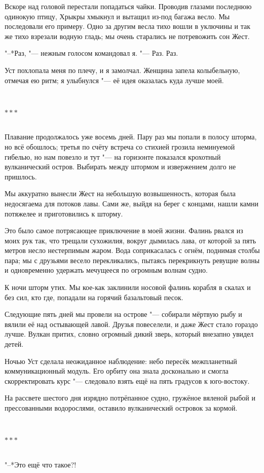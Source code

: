 \documentclass[a4paper,12pt,fleqn]{book}
\newcommand{\razd}{~\\{\centering\Large\bfseries$\ast \ast \ast$\par}~\\}
\begin{document}
Вскоре над головой перестали попадаться чайки.
Проводив глазами последнюю одинокую птицу, Хрыкры хмыкнул и вытащил из-под багажа весло.
Мы последовали его примеру.
Одно за другим весла тихо вошли в уключины и так же тихо взрезали водную гладь;
мы очень старались не потревожить сон Жест.

"--*Раз, "--- нежным голосом командовал я.
"--- Раз.
Раз.

Уст похлопала меня по плечу, и я замолчал.
Женщина запела колыбельную, отмечая ею ритм;
я улыбнулся "--- её идея оказалась куда лучше моей.

\razd

Плавание продолжалось уже восемь дней.
Пару раз мы попали в полосу шторма, но всё обошлось;
третья по счёту встреча со стихией грозила неминуемой гибелью, но нам повезло и тут "--- на горизонте показался крохотный вулканический остров.
Выбирать между штормом и извержением долго не пришлось.

Мы аккуратно вынесли Жест на небольшую возвышенность, которая была недосягаема для потоков лавы.
Сами же, выйдя на берег с концами, нашли камни потяжелее и приготовились к шторму.

Это было самое потрясающее приключение в моей жизни.
Фалинь рвался из моих рук так, что трещали сухожилия, вокруг дымилась лава, от которой за пять метров несло нестерпимым жаром.
Вода соприкасалась с огнём, поднимая столбы пара;
мы с друзьями весело перекликались, пытаясь перекрикнуть ревущие волны и одновременно удержать мечущееся по огромным волнам судно.

К ночи шторм утих.
Мы кое-как заклинили носовой фалинь корабля в скалах и без сил, кто где, попадали на горячий базальтовый песок.

Следующие пять дней мы провели на острове "--- собирали мёртвую рыбу и вялили её над остывающей лавой.
Друзья повеселели, и даже Жест стало гораздо лучше.
Вулкан притих, словно огромный дикий зверь, который внезапно увидел детей.

Ночью Уст сделала неожиданное наблюдение: небо пересёк межпланетный коммуникационный модуль.
Его орбиту она знала досконально и смогла скорректировать курс "--- следовало взять ещё на пять градусов к юго-востоку.

На рассвете шестого дня изрядно потрёпанное судно, гружёное вяленой рыбой и прессованными водорослями, оставило вулканический островок за кормой.

\razd

"--*Это ещё что такое?!
\end{document}
